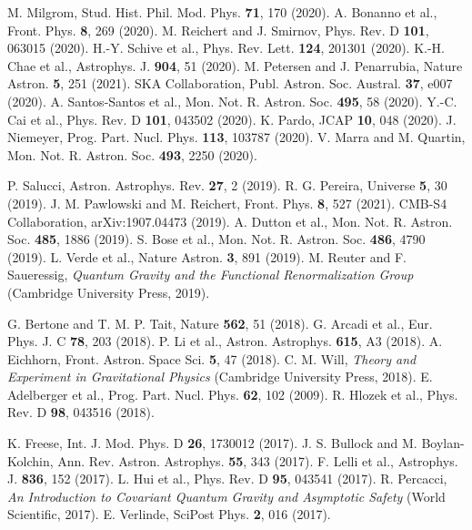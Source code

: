 \documentclass[aps,prd,twocolumn,showpacs,superscriptaddress,groupedaddress,nofootinbib]{revtex4-2}
\begin{document}
\begin{thebibliography}{99}
 M. Milgrom, Stud. Hist. Phil. Mod. Phys. \textbf{71}, 170 (2020).
 A. Bonanno et al., Front. Phys. \textbf{8}, 269 (2020).
 M. Reichert and J. Smirnov, Phys. Rev. D \textbf{101}, 063015 (2020).
 H.-Y. Schive et al., Phys. Rev. Lett. \textbf{124}, 201301 (2020).
 K.-H. Chae et al., Astrophys. J. \textbf{904}, 51 (2020).
 M. Petersen and J. Penarrubia, Nature Astron. \textbf{5}, 251 (2021).
 SKA Collaboration, Publ. Astron. Soc. Austral. \textbf{37}, e007 (2020).
 A. Santos-Santos et al., Mon. Not. R. Astron. Soc. \textbf{495}, 58 (2020).
 Y.-C. Cai et al., Phys. Rev. D \textbf{101}, 043502 (2020).
 K. Pardo, JCAP \textbf{10}, 048 (2020).
 J. Niemeyer, Prog. Part. Nucl. Phys. \textbf{113}, 103787 (2020).
 V. Marra and M. Quartin, Mon. Not. R. Astron. Soc. \textbf{493}, 2250 (2020).

 P. Salucci, Astron. Astrophys. Rev. \textbf{27}, 2 (2019).
 R. G. Pereira, Universe \textbf{5}, 30 (2019).
 J. M. Pawlowski and M. Reichert, Front. Phys. \textbf{8}, 527 (2021).
 CMB-S4 Collaboration, arXiv:1907.04473 (2019).
 A. Dutton et al., Mon. Not. R. Astron. Soc. \textbf{485}, 1886 (2019).
 S. Bose et al., Mon. Not. R. Astron. Soc. \textbf{486}, 4790 (2019).
 L. Verde et al., Nature Astron. \textbf{3}, 891 (2019).
 M. Reuter and F. Saueressig, \textit{Quantum Gravity and the Functional Renormalization Group} (Cambridge University Press, 2019).

 G. Bertone and T. M. P. Tait, Nature \textbf{562}, 51 (2018).
 G. Arcadi et al., Eur. Phys. J. C \textbf{78}, 203 (2018).
 P. Li et al., Astron. Astrophys. \textbf{615}, A3 (2018).
 A. Eichhorn, Front. Astron. Space Sci. \textbf{5}, 47 (2018).
 C. M. Will, \textit{Theory and Experiment in Gravitational Physics} (Cambridge University Press, 2018).
 E. Adelberger et al., Prog. Part. Nucl. Phys. \textbf{62}, 102 (2009).
 R. Hlozek et al., Phys. Rev. D \textbf{98}, 043516 (2018).

 K. Freese, Int. J. Mod. Phys. D \textbf{26}, 1730012 (2017).
 J. S. Bullock and M. Boylan-Kolchin, Ann. Rev. Astron. Astrophys. \textbf{55}, 343 (2017).
 F. Lelli et al., Astrophys. J. \textbf{836}, 152 (2017).
 L. Hui et al., Phys. Rev. D \textbf{95}, 043541 (2017).
 R. Percacci, \textit{An Introduction to Covariant Quantum Gravity and Asymptotic Safety} (World Scientific, 2017).
 E. Verlinde, SciPost Phys. \textbf{2}, 016 (2017).


\end{thebibliography}
\end{document}
